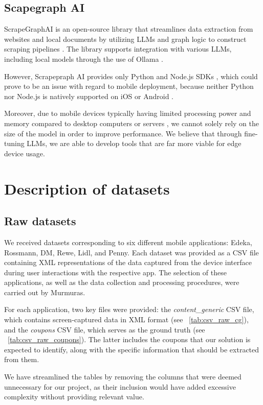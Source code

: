 \documentclass[licencjacka,en]{pracamgr}
\begin{document}
\section{Scapegraph AI}
ScrapeGraphAI is an open-source library that streamlines data extraction from websites and local documents by utilizing LLMs and graph logic to construct scraping pipelines \cite{scapegraph_repo}. The library supports integration with various LLMs, including local models through the use of Ollama \cite{ollama_repo} \cite{scapegraph_usage}.

However, Scrapepraph AI provides only Python and Node.js SDKs \cite{scapegraph_sdks}, which could prove to be an issue with regard to mobile deployment, because neither Python nor Node.js is natively supported on iOS or Android \cite{android_dev_site} \cite{ios_dev_site}.

Moreover, due to mobile devices typically having limited processing power and memory compared to desktop computers or servers \cite{mobile_resources}, we cannot solely rely on the size of the model in order to improve performance. We believe that through fine-tuning LLMs, we are able to develop tools that are far more viable for edge device usage.

\chapter{Description of datasets}
\section{Raw datasets}
We received datasets corresponding to six different mobile applications: Edeka, Rossmann, DM, Rewe, Lidl, and Penny. Each dataset was provided as a CSV file containing XML representations of the data captured from the device interface during user interactions with the respective app. The selection of these applications, as well as the data collection and processing procedures, were carried out by Murmuras.

For each application, two key files were provided: the \textit{content\_generic} CSV file, which contains screen-captured data in XML format (see ~\ref{tab:csv_raw_cg}), and the \textit{coupons} CSV file, which serves as the ground truth (see ~\ref{tab:csv_raw_coupons}). The latter includes the coupons that our solution is expected to identify, along with the specific information that should be extracted from them.

We have streamlined the tables by removing the columns that were deemed unnecessary for our project, as their inclusion would have added excessive complexity without providing relevant value.
\end{document}
